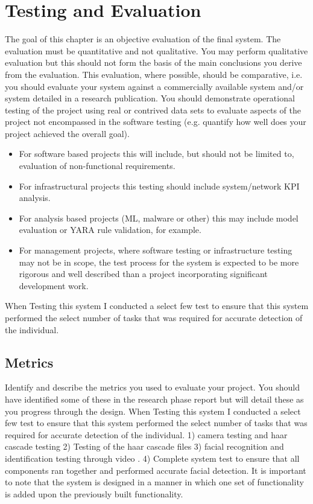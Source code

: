 \chapter{Testing and Evaluation}
\label{chap:eval}
\usepackage{graphicsx}
The goal of this chapter is an objective evaluation of the final system. The evaluation must be quantitative and not qualitative. You may perform qualitative evaluation but this should not form the basis of the main conclusions you derive from the evaluation. This evaluation, where possible, should be comparative, i.e. you should evaluate your system against a commercially available system and/or system detailed in a research publication. You should demonstrate operational testing of the project using real or contrived data sets to evaluate aspects of the project not encompassed in the software testing (e.g. quantify how well does your project achieved the overall goal). 
\begin{itemize}
    \item For software based projects this will include, but should not be limited to, evaluation of non-functional requirements.
    \item For infrastructural projects this testing should include system/network KPI analysis.
    \item For analysis based projects (ML, malware or other) this may include model evaluation or YARA rule validation, for example.
    \item For management projects, where software testing or infrastructure testing may not be in scope, the test process for the system is expected to be more rigorous and well described than a project incorporating significant development work.
    \end{itemize} 
When Testing this system I conducted a select few test to ensure that this system performed the select number of tasks that was required for accurate detection of the individual.



\section{Metrics}
Identify and describe the metrics you used to evaluate your project. You should have identified some of these in the research phase report but will detail these as you progress through the design.
When Testing this system I conducted a select few test to ensure that this system performed the select number of tasks that was required for accurate detection of the individual.
1)   camera testing and haar cascade testing
2)   Testing of the haar cascade files
3)  facial recognition and identification testing through video    . 
4)   Complete system test to ensure that all components ran together and performed accurate facial detection.
It is important to note that the system is designed in a manner in which one set of functionality is added upon the previously built functionality.

